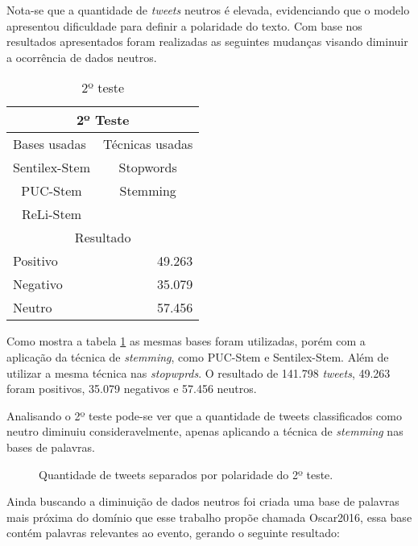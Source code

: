 Nota-se que a quantidade de \textit{tweets} neutros é elevada, evidenciando que o modelo apresentou dificuldade para definir a polaridade do texto. Com base nos resultados apresentados foram realizadas as seguintes mudanças visando diminuir a ocorrência de dados neutros.
 
\begin{table}[H]
	\centering
	\caption{2º teste}
	\label{teste-2}
	\begin{tabular}{|l|l|r}
		\hline
		\multicolumn{3}{|c|}{2º Teste} \\ \hline
		\multicolumn{2}{|l|}{Bases usadas} & \multicolumn{1}{r|}{Técnicas usadas} \\ \hline
		\multicolumn{2}{|c|}{Sentilex-Stem} & \multicolumn{1}{c|}{Stopwords} \\
		\multicolumn{2}{|c|}{PUC-Stem} & \multicolumn{1}{c|}{Stemming} \\ \cline{3-3} 
		\multicolumn{2}{|c|}{ReLi-Stem} &  \\ \hline
		\multicolumn{3}{|c|}{Resultado} \\ \hline
		\multicolumn{2}{|l|}{Positivo} & \multicolumn{1}{r|}{49.263} \\ \hline
		\multicolumn{2}{|l|}{Negativo} & \multicolumn{1}{r|}{35.079} \\ \hline
		\multicolumn{2}{|l|}{Neutro} & \multicolumn{1}{r|}{57.456} \\ \hline
		
	\end{tabular}
\end{table}

Como mostra a tabela \ref{teste-2} as mesmas bases foram utilizadas, porém com a aplicação da técnica de \textit{stemming}, como  PUC-Stem e Sentilex-Stem. Além de utilizar a mesma técnica nas  \textit{stopwprds}. O resultado de 141.798 \textit{tweets}, 49.263 foram positivos, 35.079 negativos e 57.456 neutros.


Analisando o 2º teste pode-se ver que a quantidade de tweets classificados como neutro diminuiu consideravelmente, apenas aplicando a técnica de \textit{stemming} nas bases de palavras.
\begin{figure}[H]
	\centering{}
	\caption{Quantidade de tweets separados por polaridade do 2º teste.}
	\label{teste-graf-2}
\end{figure}

Ainda buscando a diminuição de dados neutros foi criada uma base de palavras mais próxima do domínio que esse trabalho propõe chamada Oscar2016, essa base contém palavras relevantes ao evento, gerando o seguinte resultado:


